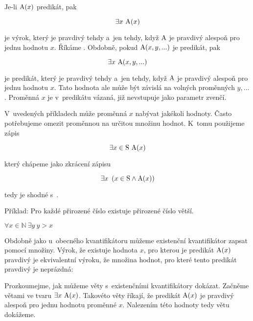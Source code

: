 Je-li \(\mathrm{A}(x)\) predikát, pak

\begin{equation}
\exists x \ \predicate{A}(x)
\end{equation}

je výrok, který je pravdivý tehdy a~jen tehdy, když \(\mathrm{A}\) je pravdivý alespoň pro jednu hodnotu \(x\). Říkáme . Obdobně, pokud \(\mathrm{A}(x, y, ...)\) je predikát, pak

\begin{equation}
\exists x \ \mathrm{A}(x, y, ...)
\end{equation}

je predikát, který je pravdivý tehdy a~jen tehdy, když \(\mathrm{A}\) je pravdivý alespoň pro jednu hodnotu \(x\). Tato hodnota ale může být závislá na volných proměnných \(y, ...\). Proměnná \(x\) je v~predikátu vázaná, již nevstupuje jako parametr zvenčí.

V~uvedených příkladech může proměnná \(x\) nabývat jakékoli hodnoty. Často potřebujeme omezit proměnnou na určitou množinu hodnot. K~tomu použijeme zápis

\begin{equation}
\exists x \in \mathrm{S} \ \predicate{A}(x)
\end{equation}

který chápeme jako zkrácení zápisu

\begin{equation}
\exists x \ \left( x \in \mathrm{S} \land \mathrm{A}(x) \right)
\end{equation}

tedy  je shodné s~.

Příklad: Pro každé přirozené číslo existuje přirozené číslo větší. 

\(\forall x \in \mathbb{N} \ \exists y \ y > x\)

Obdobně jako u~obecného kvantifikátoru můžeme existenční kvantifikátor zapsat pomocí množiny. Výrok, že existuje hodnota \(x\), pro kterou je predikát \(\mathrm{A}(x)\) pravdivý je ekvivalentní výroku, že množina hodnot, pro které tento predikát pravdivý je neprázdná:


Prozkoumejme, jak můžeme věty s~existenčními kvantifikátory dokázat. Začněme větami ve tvaru \(\exists x \ \predicate{A}(x)\). Takovéto věty říkají, že predikát \(\mathrm{A}(x)\) je pravdivý alespoň pro jednu hodnotu proměnné \(x\).  Nalezením této hodnoty tedy větu dokážeme.

